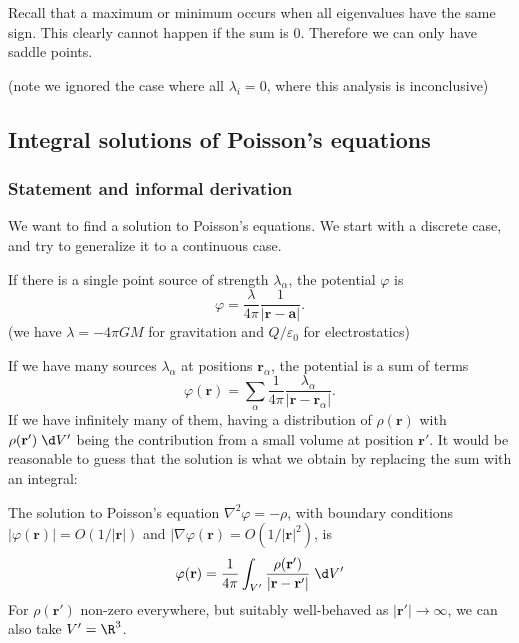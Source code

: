 \documentclass[a4paper]{article}
\begin{document}
Recall that a maximum or minimum occurs when all eigenvalues have the same sign. This clearly cannot happen if the sum is 0. Therefore we can only have saddle points.

(note we ignored the case where all $\lambda_i = 0$, where this analysis is inconclusive)
\subsection{Integral solutions of Poisson's equations}
\subsubsection{Statement and informal derivation}
We want to find a solution to Poisson's equations. We start with a discrete case, and try to generalize it to a continuous case.

If there is a single point source of strength $\lambda_\alpha$, the potential $\varphi$ is
\[
  \varphi = \frac{\lambda}{4\pi} \frac{1}{|\mathbf{r} - \mathbf{a}|}.
\]
(we have $\lambda = -4\pi GM$ for gravitation and $Q/\varepsilon_0$ for electrostatics)

If we have many sources $\lambda_\alpha$ at positions $\mathbf{r}_\alpha$, the potential is a sum of terms
\[
  \varphi(\mathbf{r}) = \sum_{\alpha} \frac{1}{4\pi}\frac{\lambda_\alpha}{|\mathbf{r} - \mathbf{r}_\alpha|}.
\]
If we have infinitely many of them, having a distribution of $\rho(\mathbf{r})$ with $\rho(\mathbf{r}')\;\d V'$ being the contribution from a small volume at position $\mathbf{r}'$. It would be reasonable to guess that the solution is what we obtain by replacing the sum with an integral:

\begin{prop}
  The solution to Poisson's equation $\nabla^2 \varphi = -\rho$, with boundary conditions $|\varphi (\mathbf{r})| = O(1/|\mathbf{r}|)$ and $|\nabla\varphi(\mathbf{r}) = O(1/|\mathbf{r}|^2)$, is 
  \[
    \varphi(\mathbf{r}) = \frac{1}{4\pi}\int_{V'} \frac{\rho(\mathbf{r}')}{|\mathbf{r} - \mathbf{r}'|}\;\d V'
  \]
  For $\rho(\mathbf{r}')$ non-zero everywhere, but suitably well-behaved as $|\mathbf{r}'| \to \infty$, we can also take $V' = \R^3$.
\end{prop}
\end{document}
